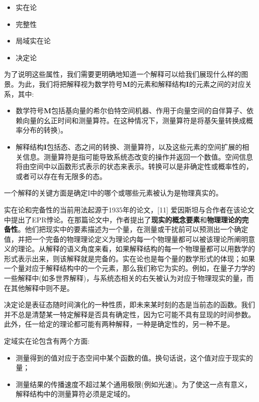 \begin{itemize}
\item 实在论
\item 完整性
\item 局域实在论
\item 决定论
\end{itemize}

为了说明这些属性，我们需要更明确地知道一个解释可以给我们展现什么样的图景。为此，我们将把解释视为数学符号\textbf{M}的元素和解释结构\textbf{I}的元素之间的对应关系，其中:

\begin{itemize}
\item 数学符号\textbf{M}包括基向量的希尔伯特空间机器、作用于向量空间的自伴算子、依赖向量的幺正时间和测量算符。在这种情况下，测量算符是将基矢量转换成概率分布的转换)。
\item 解释结构\textbf{I}包括态、态之间的转换、测量算符，以及这些元素的空间扩展的相关信息。测量算符是指可能导致系统态改变的操作并返回一个数值。空间信息将由空间中以函数形式表示的状态来表示。转换可以是非确定性或概率性的，或者可以存在有无限多的态。
\end{itemize}

一个解释的关键方面是确定I中的哪个或哪些元素被认为是物理真实的。

实在论和完备性的当前用法起源于1935年的论文，[11] 爱因斯坦与合作者在该论文中提出了EPR悖论。在那篇论文中，作者提出了\textbf{现实的概念要素}和\textbf{物理理论的完备性}。他们把现实中的要素描述为一个量，在测量或干扰前可以预测出一个确定值，并把一个完备的物理理论定义为理论内每一个物理量都可以被该理论所阐明意义的理论。从解释的语义角度来看，如果解释结构的每一个物理量都可以用数学的形式表示出来，则该解释就是完备的。实在论也是每个量的数学形式的体现；如果一个量对应于解释结构中的一个元素，那么我们称它为实的。例如，在量子力学的一些解释中(如多世界解释)，与系统态相关的右矢被认为对应于物理现实的量，而在其他解释中则不是。

决定论是表征态随时间演化的一种性质，即未来某时刻的态是当前态的函数。我们并不总是清楚某一特定解释是否具有确定性，因为它可能不具有显现的时间参数。此外，任一给定的理论都可能有两种解释，一种是确定性的，另一种不是。

定域实在论包含有两个方面:

\begin{itemize}
\item 测量得到的值对应于态空间中某个函数的值。换句话说，这个值对应于现实的量；
\item 测量结果的传播速度不超过某个通用极限(例如光速)。为了使这一点有意义，解释结构中的测量算符必须是定域的。
\end{itemize}

